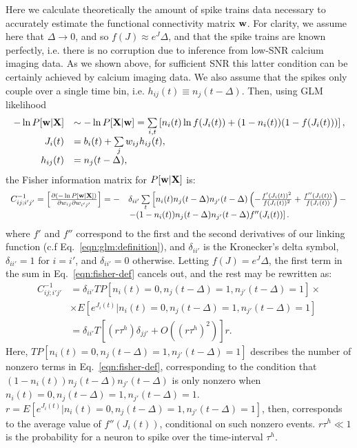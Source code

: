 Here we calculate theoretically the amount of spike trains data necessary to accurately estimate the functional connectivity matrix $\mathbf{w}$. For clarity, we assume here that $\Delta \rightarrow 0$, and so $f(J)\approx e^J\Delta$, and that the spike trains are known perfectly, i.e. there is no corruption due to inference from low-SNR calcium imaging data. 
As we shown above, for sufficient SNR this latter condition can be certainly achieved by calcium imaging data.
We also assume that the spikes only couple over a single time bin, i.e. $h_{ij}(t)\equiv n_j(t-\Delta)$.
Then, using GLM likelihood
\begin{equation}\label{eqn:fisher-glm}
\begin{array}{rl}
-\ln P[\bw | \bX] &\sim -\ln P[\bX | \bw] =
\sum\limits_{i,t} \left[ n_i(t) \ln f(J_i(t)) + (1-n_i(t)) (1-f(J_i(t))) \right], \\
J_i(t) &= b_i(t) + \sum\limits_j w_{ij} h_{ij}(t), \\
h_{ij}(t) &= n_j(t-\Delta),
\end{array}
\end{equation}
the Fisher information matrix for $P[\mathbf{w} | {\bf X}]$ is:
\begin{equation}\label{eqn:fisher-def}
\begin{array}{rl}
C^{-1}_{ij;i'j'}=\left[\frac{\partial (-\ln P[\bw | \bX])}{\partial \w_{ij}\partial \w_{i'j'}}\right]
=-&\delta_{ii'}\sum\limits_t\left[
n_i(t)n_{j}(t-\Delta)n_{j'}(t-\Delta)\left(-\frac{f'(J_i(t))^2}{f(J_i(t))^2} +
\frac{f''(J_i(t))}{f(J_i(t))}\right) - \right. \\
&\left.-(1-n_i(t))n_{j}(t-\Delta)n_{j'}(t-\Delta)f''(J_i(t))\right].
\end{array}
\end{equation}
where $f'$ and $f''$ correspond to the first and the second derivatives of our linking function (c.f Eq.~\eqref{eqn:glm:definition}), and $\delta_{ii'}$ is
the Kronecker's delta symbol, $\delta_{ii'}=1$ for $i=i'$, and $\delta_{ii'}=0$ otherwise.  Letting $f(J)=e^J\Delta$, the first term in the sum in Eq.~\eqref{eqn:fisher-def} cancels out, and the rest may be rewritten as:
\begin{equation}\label{eqn:fisher}
\begin{array}{rl}
C^{-1}_{ij;i'j'}
&=\delta_{ii'} T P[n_i(t)=0, n_j(t-\Delta)=1, n_{j'}(t-\Delta)=1]\times \\
&\times E[e^{J_i(t)}|n_i(t)=0, n_j(t-\Delta)=1, n_{j'}(t-\Delta)=1] \\
&= \delta_{ii'}T\left[(r \tau^h)\delta_{jj'}+O((r \tau^h)^2)\right]r.
\end{array}
\end{equation}
Here, $TP[n_i(t)=0, n_j(t-\Delta)=1, n_{j'}(t-\Delta)=1]$ describes the number of nonzero
terms in Eq.~\eqref{eqn:fisher-def}, corresponding to the condition that
$(1-n_i(t))n_{j}(t-\Delta)n_{j'}(t-\Delta)$ is only nonzero when 
$n_i(t)=0, n_j(t-\Delta)=1, n_{j'}(t-\Delta)=1$. 
$r=E[e^{J_i(t)}|n_i(t)=0, n_j(t-\Delta)=1, n_{j'}(t-\Delta)=1]$, then, 
corresponds to the average value of $f''(J_i(t))$, conditional on such nonzero events. 
$r\tau^h \ll 1$ is the probability for a neuron to spike over the time-interval  $\tau^h$.


